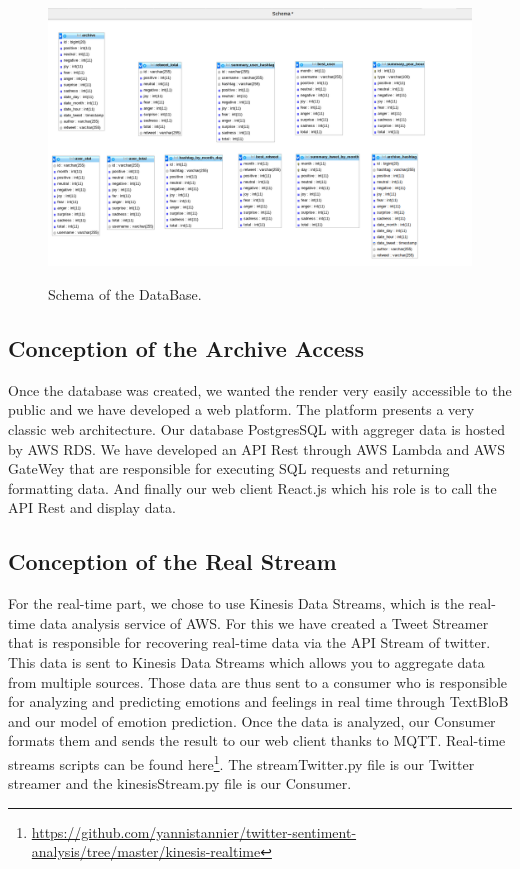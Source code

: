 \documentclass{acmtog} %
\begin{document}
\begin{figure}[H]
{\includegraphics[width=\linewidth]{table-web-db.png}}
\caption{Schema of the DataBase.}
  \label{fig:archivedb}
\end{figure}


\subsection{Conception of the Archive Access}
\label{subsub:conception_aa}

Once the database was created, we wanted the render very easily accessible to the public and we have developed a web platform.
The platform presents a very classic web architecture. Our database PostgresSQL with aggreger data is hosted by AWS RDS.
We have developed an API Rest through AWS Lambda and AWS GateWey that are responsible for executing SQL requests and returning formatting data.
And finally our web client React.js which his role is to call the API Rest and display data.

\subsection{Conception of the Real Stream}
\label{subsub:conception_rs}

For the real-time part, we chose to use Kinesis Data Streams, which is the real-time data analysis service of AWS.
For this we have created a Tweet Streamer that is responsible for recovering real-time data via the API Stream of twitter. This data is sent to Kinesis Data Streams which allows you to aggregate data from multiple sources.
Those data are thus sent to a consumer who is responsible for analyzing and predicting emotions and feelings in real time through TextBloB and our model of emotion prediction.
Once the data is analyzed, our Consumer formats them and sends the result to our web client thanks to MQTT.
Real-time streams scripts can be found here\footnote{\url{https://github.com/yannistannier/twitter-sentiment-analysis/tree/master/kinesis-realtime}}.
The streamTwitter.py file is our Twitter streamer and the kinesisStream.py file is our Consumer.
\end{document}
